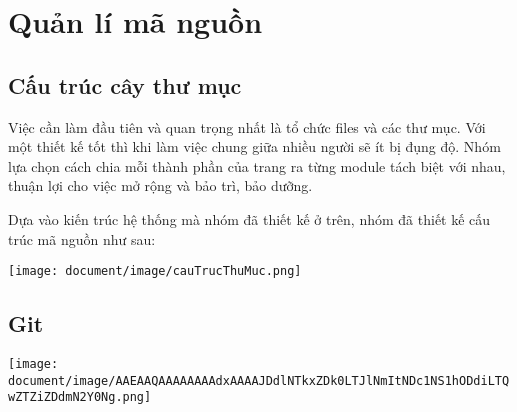 
\section{Quản lí mã nguồn}
\subsection{Cấu trúc cây thư mục}
Việc cần làm đầu tiên và quan trọng nhất là tổ chức files và các thư mục. Với một thiết kế tốt thì khi làm việc chung giữa nhiều người sẽ ít bị đụng độ. Nhóm lựa chọn cách chia mỗi thành phần của trang ra từng module tách biệt với nhau, thuận lợi cho việc mở rộng và bảo trì, bảo dưỡng.

Dựa vào kiến trúc hệ thống mà nhóm đã thiết kế ở trên, nhóm đã thiết kế cấu trúc mã nguồn như sau:
\begin{center}
  \captionsetup{type=figure}
  \texttt{[image: document/image/cauTrucThuMuc.png]}
\end{center}
\clearpage

\subsection{Git}
\begin{center}
  \captionsetup{type=figure}
  \texttt{[image: document/image/AAEAAQAAAAAAAAdxAAAAJDdlNTkxZDk0LTJlNmItNDc1NS1hODdiLTQwZTZiZDdmN2Y0Ng.png]}
\end{center}


